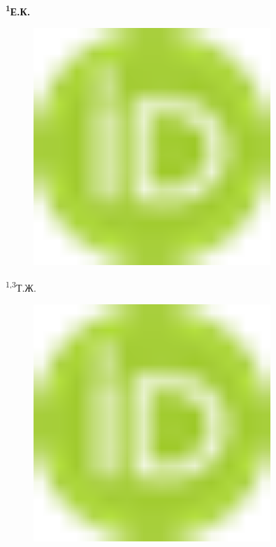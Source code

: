 {\bfseries \textsuperscript{1}Е.К.
\begin{figure}[H]
	\centering
	\includegraphics[width=0.8\textwidth]{media/ict/image1}
	\caption*{}
\end{figure}

\textsuperscript{1,3}Т.Ж.
\begin{figure}[H]
	\centering
	\includegraphics[width=0.8\textwidth]{media/ict/image1}
	\caption*{}
\end{figure}

}

